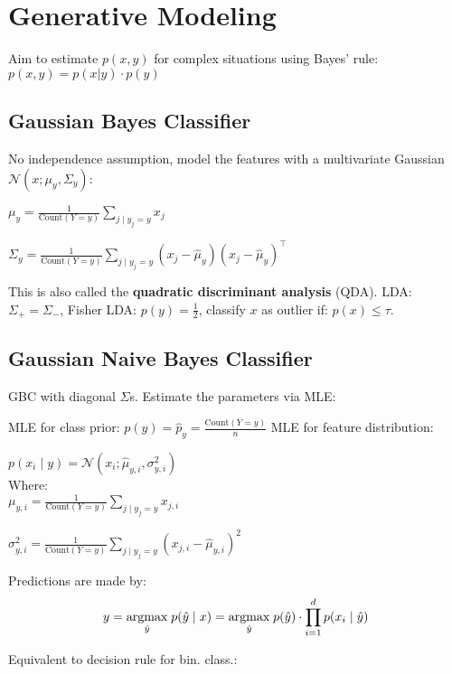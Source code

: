 \section*{Generative Modeling}

Aim to estimate $p(x, y)$ for complex situations using Bayes' rule: $p(x,y) = p(x|y) \cdot p(y)$

\subsection*{Gaussian Bayes Classifier}

No independence assumption, model the features with a multivariate Gaussian $\mathcal{N}(x; \mu_y, \Sigma_y)$:

\quad $\mu_{y} = \frac{1}{\text{Count}(Y = y)} \sum_{j \; | \; y_j = y} x_{j}$

\quad $\Sigma_{y} = \frac{1}{\text{Count}(Y = y)} \sum_{j \; | \; y_j = y} (x_{j} - \hat \mu_{y}) (x_{j} - \hat \mu_{y})^\top$

This is also called the \textbf{quadratic discriminant analysis} (QDA). LDA: $\Sigma_+ = \Sigma_-$, Fisher LDA: $p(y) = \frac{1}{2}$, classify $x$ as outlier if: $p(x) \leq \tau$.

\subsection*{Gaussian Naive Bayes Classifier}

GBC with diagonal $\Sigma$s. Estimate the parameters via MLE:

MLE for class prior: $p(y) = \hat p_y = \frac{\text{Count}(Y = y)}{n}$
MLE for feature distribution:

\qquad \qquad $p(x_i \; | \; y) = \mathcal{N}(x_i; \hat \mu_{y,i}, \sigma^2_{y,i})$ \\[-13pt]

Where:\\[-10pt]

\qquad \quad $\mu_{y,i} = \frac{1}{\text{Count}(Y = y)} \sum_{j \; | \; y_j = y} x_{j,i}$

\qquad \quad $\sigma^2_{y,i} = \frac{1}{\text{Count}(Y = y)} \sum_{j \; | \; y_j = y} (x_{j,i} - \hat \mu_{y, i})^2$


Predictions are made by: \\[-20pt]
$$y = \underset{\hat y}{\text{argmax}} \; p(\hat y \; | \; x) = \underset{\hat y}{\text{argmax}} \; p(\hat y) \cdot \prod_{i=1}^d p(x_i \; | \; \hat y)$$

Equivalent to decision rule for bin. class.: \\[-8pt]

